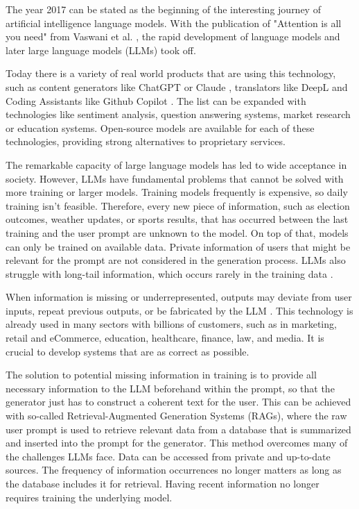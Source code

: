 The year 2017 can be stated as the beginning of the interesting journey of artificial intelligence language models. With the publication of "Attention is all you need" from Vaswani et al. \cite{vaswani2023attentionneed}, the rapid development of language models and later large language models (LLMs) took off.

Today there is a variety of real world products that are using this technology, such as content generators like ChatGPT \cite{OpenAI_2022} or Claude \cite{Anthropic_2023}, translators like DeepL \cite{DeepL_SE} and Coding Assistants like Github Copilot \cite{Friedman_2022}. The list can be expanded with technologies like sentiment analysis, question answering systems, market research or education systems. Open-source models are available for each of these technologies, providing strong alternatives to proprietary services.

The remarkable capacity of large language models has led to wide acceptance in society. However, LLMs have fundamental problems that cannot be solved with more training or larger models. Training models frequently is expensive, so daily training isn't feasible. Therefore, every new piece of information, such as election outcomes, weather updates, or sports results, that has occurred between the last training and the user prompt are unknown to the model. On top of that, models can only be trained on available data. Private information of users that might be relevant for the prompt are not considered in the generation process. LLMs also struggle with long-tail information, which occurs rarely in the training data \cite{Kandpal.15.11.2022}.

When information is missing or underrepresented, outputs may deviate from user inputs, repeat previous outputs, or be fabricated by the LLM \cite{Zhang.03.09.2023}. This technology is already used in many sectors with billions of customers, such as in marketing, retail and eCommerce, education, healthcare, finance, law, and media. It is crucial to develop systems that are as correct as possible.

The solution to potential missing information in training is to provide all necessary information to the LLM beforehand within the prompt, so that the generator just has to construct a coherent text for the user. This can be achieved with so-called Retrieval-Augmented Generation Systems (RAGs), where the raw user prompt is used to retrieve relevant data from a database that is summarized and inserted into the prompt for the generator. This method overcomes many of the challenges LLMs face. Data can be accessed from private and up-to-date sources. The frequency of information occurrences no longer matters as long as the database includes it for retrieval. Having recent information no longer requires training the underlying model.

